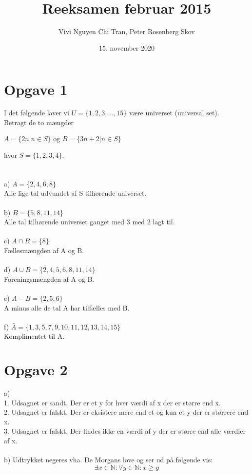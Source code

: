 \documentclass{article}
\title{Reeksamen februar 2015}
\author{Vivi Nguyen Chi Tran, Peter Rosenberg Skov}
\date{15. november 2020}
\begin{document}
\maketitle
\newpage
\section*{Opgave 1}
I det følgende laver vi $U = \{1,2,3,...,15\}$ være universet (universal set).\\
Betragt de to mængder
\begin{center}
$A = \{2n | n \in S\}$ og $B = \{3n + 2 | n \in S\}  $
\end{center}
hvor $S = \{1,2,3,4\}.$\\
\\
\\
a) $A = \{2,4,6,8\}$\\
Alle lige tal udvundet af S tilhørende universet.
\\
\\
b) $B = \{5,8,11,14\}$\\
Alle tal tilhørende universet ganget med 3 med 2 lagt til.
\\
\\
c) $A \cap B = \{8\}$\\
Fællesmængden af A og B.
\\
\\
d) $A \cup B = \{2,4,5,6,8,11,14\}$\\
Foreningsmængden af A og B.
\\
\\
e) $A - B = \{2,5,6\}$\\
A minus alle de tal A har tilfælles med B.
\\
\\
f) $\bar{A} = \{1,3,5,7,9,10,11,12,13,14,15\}$ \\
Komplimentet til A.

\section*{Opgave 2}
a)
\\
1. Udsagnet er sandt. Der er et y for hver værdi af x der er større end x.
\\
2. Udsagnet er falskt. Der er eksistere mere end et og kun et y der er størrere end x.
\\
3. Udsagnet er falskt. Der findes ikke en værdi af y der er større end alle værdier af x.
\\
\\
b) Udtrykket negeres vha. De Morgans love og ser ud på følgende vis: \\
$$\exists x \in \mathbb{N}: \forall y \in \mathbb{N}: x \geq y
$$
\end{document}
